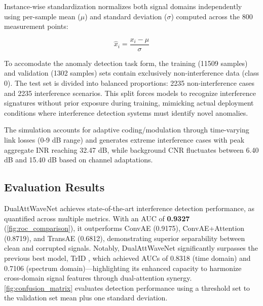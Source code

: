\documentclass[12pt]{article}
\begin{document}
Instance-wise standardization normalizes both signal domains independently using per-sample mean (\( \mu \)) and standard deviation (\( \sigma \)) computed across the 800 measurement points:

\begin{equation}
    \hat{x}_i = \frac{x_i - \mu}{\sigma}
\end{equation}

To accomodate the anomaly detection task form, the training (11509 samples) and validation (1302 samples) sets contain exclusively non-interference data (class 0). The test set is divided into balanced proportions: 2235 non-interference cases and 2235 interference scenarios. This split forces models to recognize interference signatures without prior exposure during training, mimicking actual deployment conditions where interference detection systems must identify novel anomalies.

The simulation accounts for adaptive coding/modulation through time-varying link losses (0-9 dB range) and generates extreme interference cases with peak aggregate INR reaching 32.47 dB, while background CNR fluctuates between 6.40 dB and 15.40 dB based on channel adaptations.

\subsection{Evaluation Results}

DualAttWaveNet achieves state-of-the-art interference detection performance, as quantified across multiple metrics. With an AUC of \textbf{0.9327} (\autoref{fig:roc_comparison}), it outperforms ConvAE (0.9175), ConvAE+Attention (0.8719), and TransAE (0.6812), demonstrating superior separability between clean and corrupted signals. Notably, DualAttWaveNet significantly surpasses the previous best model, TrID \cite{saifaldawlaGenAIBasedModelsNGSO2024}, which achieved AUCs of 0.8318 (time domain) and 0.7106 (spectrum domain)—highlighting its enhanced capacity to harmonize cross-domain signal features through dual-attention synergy. \autoref{fig:confusion_matrix} evaluates detection performance using a threshold set to the validation set mean plus one standard deviation.
\end{document}
